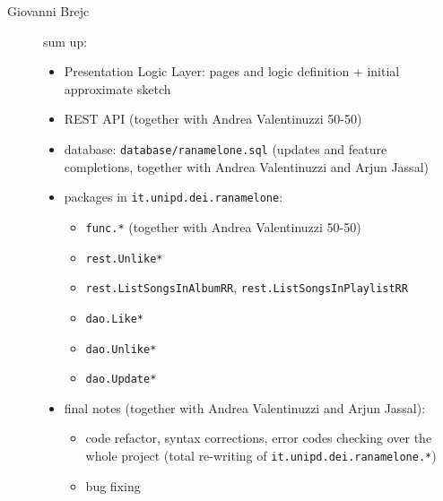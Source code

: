 \begin{description}
    \item[Giovanni Brejc] sum up:
    \begin{itemize}
        \item Presentation Logic Layer: pages and logic definition + initial approximate sketch
        \item REST API (together with Andrea Valentinuzzi 50-50)
        \item database: \verb|database/ranamelone.sql| (updates and feature completions, together with Andrea Valentinuzzi and Arjun Jassal)
        \item packages in \verb|it.unipd.dei.ranamelone|:
        \begin{itemize}
            \item \verb|func.*| (together with Andrea Valentinuzzi 50-50)
            \item \verb|rest.Unlike*|
            \item \verb|rest.ListSongsInAlbumRR|, \verb|rest.ListSongsInPlaylistRR|
            \item \verb|dao.Like*|
            \item \verb|dao.Unlike*|
            \item \verb|dao.Update*|
        \end{itemize}
        \item final notes (together with Andrea Valentinuzzi and Arjun Jassal):
        \begin{itemize}
            \item code refactor, syntax corrections, error codes checking over the whole project (total re-writing of \verb|it.unipd.dei.ranamelone.*|)
            \item bug fixing
        \end{itemize}
    \end{itemize}
    

\end{description}
